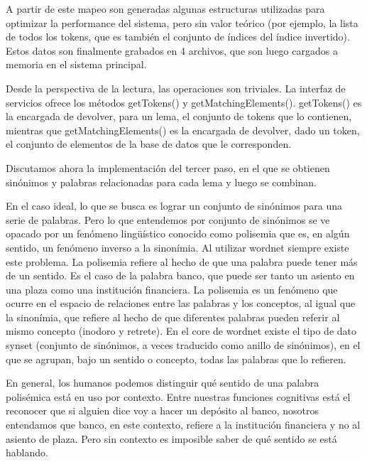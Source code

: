 A partir de este mapeo son generadas algunas estructuras utilizadas para optimizar la performance del sistema, pero sin valor teórico (por ejemplo, la lista de todos los tokens, que es también el conjunto de índices del índice invertido). Estos datos son finalmente grabados en 4 archivos, que son luego cargados a memoria en el sistema principal.

Desde la perspectiva de la lectura, las operaciones son triviales. La interfaz de servicios ofrece los métodos getTokens() y getMatchingElements(). getTokens() es la encargada de devolver, para un lema, el conjunto de tokens que lo contienen, mientras que getMatchingElements() es la encargada de devolver, dado un token, el conjunto de elementos de la base de datos que le corresponden.

Discutamos ahora la implementación del tercer paso, en el que se obtienen sinónimos y palabras relacionadas para cada lema y luego se combinan.

En el caso ideal, lo que se busca es lograr un conjunto de sinónimos para una serie de palabras. Pero lo que entendemos por conjunto de sinónimos se ve opacado por un fenómeno lingüístico conocido como polisemia que es, en algún sentido, un fenómeno inverso a la sinonímia. Al utilizar wordnet siempre existe este problema. La polisemia refiere al hecho de que una palabra puede tener más de un sentido. Es el caso de la palabra banco, que puede ser tanto un asiento en una plaza como una institución financiera. La polisemia es un fenómeno que ocurre en el espacio de relaciones entre las palabras y los conceptos, al igual que la sinonímia, que refiere al hecho de que diferentes palabras pueden referir al mismo concepto (inodoro y retrete). En el core de wordnet existe el tipo de dato synset (conjunto de sinónimos, a veces traducido como anillo de sinónimos), en el que se agrupan, bajo un sentido o concepto, todas las palabras que lo refieren.

En general, los humanos podemos distinguir qué sentido de una palabra polisémica está en uso por contexto. Entre nuestras funciones cognitivas está el reconocer que si alguien dice voy a hacer un depósito al banco, nosotros entendamos que banco, en este contexto, refiere a la institución financiera y no al asiento de plaza. Pero sin contexto es imposible saber de qué sentido se está hablando.


